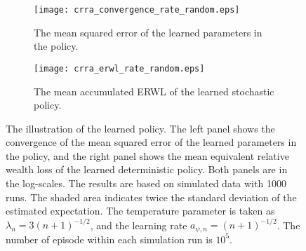 \begin{figure}[htbp]
	\centering
	\begin{subfigure}{0.47\textwidth}
		\texttt{[image: crra\_convergence\_rate\_random.eps]}
		\caption{The mean squared error of the learned parameters in the policy.}
	\end{subfigure}
	\begin{subfigure}{0.47\textwidth}
		\texttt{[image: crra\_erwl\_rate\_random.eps]}
		\caption{The mean accumulated ERWL of the learned stochastic policy.}
	\end{subfigure}
	\caption{The illustration of the learned policy. The left panel shows the convergence of the mean squared error of the learned parameters in the policy, and the right panel shows the mean equivalent relative wealth loss of the learned deterministic policy. Both panels are in the log-scales. The results are based on simulated data with 1000 runs. The shaded area indicates twice the standard deviation of the estimated expectation. The temperature parameter is taken as $\lambda_n=3 (n+1)^{-1/2}$, and the learning rate $a_{\psi, n} = (n+1)^{-1/2}$. The number of episode within each simulation run is $10^5$.}
	\label{fig:merton 2}
\end{figure}

